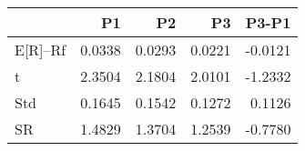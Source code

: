 \begin{tabular}{lrrrr}
\toprule
 & P1 & P2 & P3 & P3-P1 \\
\midrule
E[R]--Rf & 0.0338 & 0.0293 & 0.0221 & -0.0121 \\
t & 2.3504 & 2.1804 & 2.0101 & -1.2332 \\
Std & 0.1645 & 0.1542 & 0.1272 & 0.1126 \\
SR & 1.4829 & 1.3704 & 1.2539 & -0.7780 \\
\bottomrule
\end{tabular}
